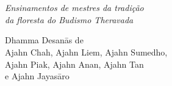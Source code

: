 
\cleartorecto
\thispagestyle{empty}
\vspace*{5em}
\newlength\titleLength
\newlength\xheight

{\centering

\settowidth{\titleLength}{%
  {\Large\chapterTitleFont\scshape\MakeLowercase{\thetitle}}%
}

{\Large\chapterTitleFont\scshape\MakeLowercase{\thetitle}}\\[0.3\baselineskip]
\raisebox{0.5\xheight}{\color[gray]{0.4}\rule{\titleLength}{0.1pt}}\\[0.3\baselineskip]
{\itshape
Ensinamentos de mestres da tradição\\
da floresta do Budismo Theravada}

\vfill

Dhamma Desanās de\\
Ajahn Chah, Ajahn Liem, Ajahn Sumedho,\\
Ajahn Piak, Ajahn Anan, Ajahn Tan\\
e Ajahn Jayasāro

\vspace*{5em}

}


